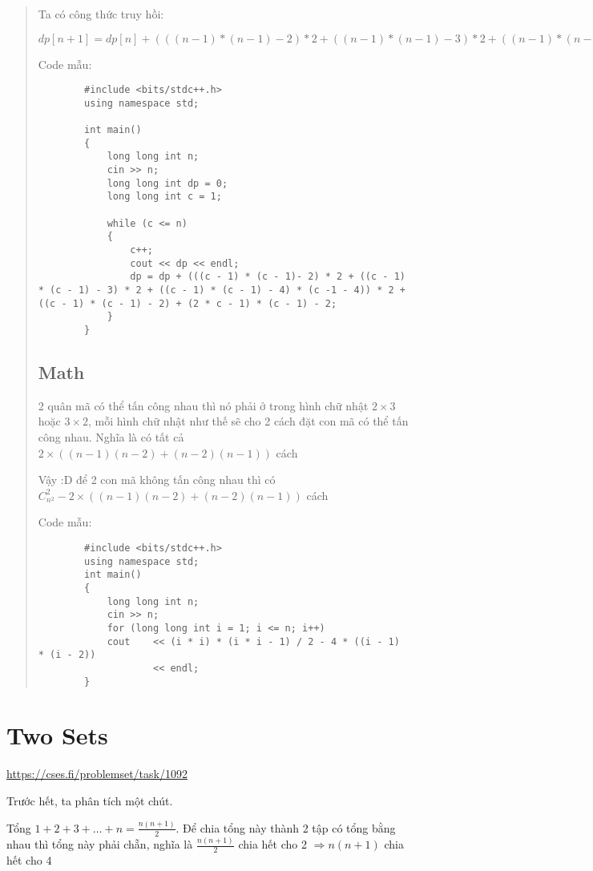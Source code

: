 \documentclass[10pt]{article}
\begin{document}
\begin{quote}
    Ta có công thức truy hồi:

    $ dp[n+1] = dp[n] + (((n - 1) * (n - 1) - 2) * 2 + ((n - 1) * (n - 1) - 3) * 2 + ((n - 1) * (n - 1) - 4) * (n - 1 - 4)) * 2 + ((n - 1) * (n - 1) - 2) + (2 * n - 1) * (n - 1) - 2 $

    Code mẫu:
    \begin{lstlisting}
        #include <bits/stdc++.h>
        using namespace std;

        int main()
        {
            long long int n;
            cin >> n;
            long long int dp = 0;
            long long int c = 1;

            while (c <= n)
            {
                c++;
                cout << dp << endl;
                dp = dp + (((c - 1) * (c - 1)- 2) * 2 + ((c - 1) * (c - 1) - 3) * 2 + ((c - 1) * (c - 1) - 4) * (c -1 - 4)) * 2 + ((c - 1) * (c - 1) - 2) + (2 * c - 1) * (c - 1) - 2;
            }
        }
    \end{lstlisting}

    \subsection*{Math}
    2 quân mã có thể tấn công nhau thì nó phải ở trong hình chữ nhật $2 \times 3$ hoặc $3 \times 2$, mỗi hình chữ nhật như thế sẽ cho 2 cách đặt con mã có thể tấn công nhau. Nghĩa là có tất cả $2 \times ((n - 1)(n - 2) + (n - 2)(n - 1))$ cách

    Vậy :D để 2 con mã không tấn công nhau thì có $C^2_{n^2} - 2 \times ((n - 1)(n - 2) + (n - 2)(n - 1))$ cách

    Code mẫu:
    \begin{lstlisting}
        #include <bits/stdc++.h>
        using namespace std;
        int main()
        {
            long long int n;
            cin >> n;
            for (long long int i = 1; i <= n; i++)
            cout    << (i * i) * (i * i - 1) / 2 - 4 * ((i - 1) * (i - 2))
                    << endl;
        }
    \end{lstlisting}
\end{quote}
\newpage
\section{Two Sets}
\url{https://cses.fi/problemset/task/1092}

Trước hết, ta phân tích một chút.

Tổng $1 + 2 + 3 + \ldots + n = \frac{n(n+1)}{2}$. Để chia tổng này thành 2 tập có tổng bằng nhau thì tổng này phải chẵn, nghĩa là $\frac{n(n+1)}{2}$ chia hết cho 2 $\Rightarrow n(n + 1)$ chia hết cho 4
\end{document}

